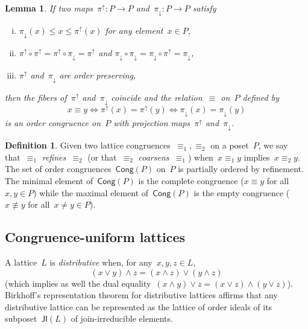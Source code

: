 \documentclass{memo-l}
\newtheorem{lemma}[theorem]{Lemma}
\theoremstyle{definition}
\newtheorem{definition}[theorem]{Definition}
\newcommand{\darkblue}{\color{darkblue}} %
\newcommand{\defn}[1]{\textsl{\darkblue #1}} %
\newcommand{\meet}{\wedge} %
\newcommand{\join}{\vee} %
\newcommand{\projDown}{\pi_\downarrow} %
\newcommand{\projUp}{\pi^\uparrow} %
\newcommand{\JI}{\mathsf{JI}} %
\newcommand{\Cong}{\mathsf{Cong}} %
\begin{document}
\begin{lemma}
\label{lem:conditionsProjectionMaps}
If two maps~$\projUp : P \to P$ and~$\projDown : P \to P$ satisfy
\begin{enumerate}[(i)]
\item
\label{item:conditionsProjectionMapsSandwich}
$\projDown(x) \le x \le \projUp(x)$ for any element~$x \in P$,

\item
\label{item:conditionsProjectionMapsLastWins}
$\projUp \circ \projUp = \projUp \circ \projDown = \projUp$ and $\projDown \circ \projDown = \projDown \circ \projUp = \projDown$,

\item
\label{item:conditionsProjectionMapsOrderPreserving}
$\projUp$ and~$\projDown$ are order preserving,
\end{enumerate}
then the fibers of~$\projUp$ and~$\projDown$ coincide and the relation~$\equiv$ on~$P$ defined by
\[
x \equiv y \iff \projUp(x) = \projUp(y) \iff \projDown(x) = \projDown(y)
\]
is an order congruence on~$P$ with projection maps~$\projUp$ and~$\projDown$.
\end{lemma}

\begin{definition}
Given two lattice congruences~$\equiv_1, \equiv_2$ on a poset~$P$, we say that~$\equiv_1$ \defn{refines}~$\equiv_2$ (or that~$\equiv_2$ \defn{coarsens}~$\equiv_1$) when~$x \equiv_1 y$ implies~$x \equiv_2 y$.
The set of order congruences~$\Cong(P)$ on~$P$ is partially ordered by refinement.
The minimal element of~$\Cong(P)$ is the complete congruence ($x \equiv y$ for all~$x,y \in P$) while the maximal element of~$\Cong(P)$ is the empty congruence ($x \not\equiv y$ for all~$x \ne y \in P$).
\end{definition}

\subsection{Congruence-uniform lattices}
\label{subsec:congruenceUniformLattices}

A lattice~$L$ is \defn{distributive} when, for any~$x,y,z \in L$,
\[
(x \join y) \meet z = (x \meet z) \join (y \meet z)
\]
(which implies as well the dual equality~$(x \meet y) \join z = (x \join z) \meet (y \join z)$).
Birkhoff's representation theorem for distributive lattices affirms that any distributive lattice can be represented as the lattice of order ideals of its subposet~$\JI(L)$ of join-irreducible elements.
\end{document}
